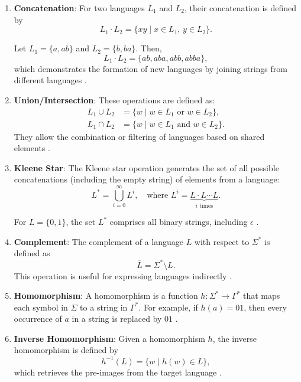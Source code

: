 \begin{enumerate}
    \item \textbf{Concatenation}: For two languages $L_1$ and $L_2$, their concatenation is defined by 
    \[
    L_1 \cdot L_2 = \{xy \mid x \in L_1,\, y \in L_2\}.
    \]
    \begin{example}
    Let $L_1 = \{a, ab\}$ and $L_2 = \{b, ba\}$. Then,
    \[
    L_1 \cdot L_2 = \{ab, aba, abb, abba\},
    \]
    which demonstrates the formation of new languages by joining strings from different languages \cite{hopcroft2006introduction}.
    \end{example}

    \item \textbf{Union/Intersection}: These operations are defined as:
    \begin{align*}
        L_1 \cup L_2 &= \{w \mid w \in L_1 \text{ or } w \in L_2\}, \\
        L_1 \cap L_2 &= \{w \mid w \in L_1 \text{ and } w \in L_2\}.
    \end{align*}
    They allow the combination or filtering of languages based on shared elements \cite{hopcroft2006introduction}.

    \item \textbf{Kleene Star}: The Kleene star operation generates the set of all possible concatenations (including the empty string) of elements from a language:
    \[
    L^\ast = \bigcup_{i=0}^\infty L^i, \quad \text{where } L^i = \underbrace{L \cdot L \cdots L}_{i \text{ times}}.
    \]
    \begin{example}
    For $L = \{0, 1\}$, the set $L^\ast$ comprises all binary strings, including $\epsilon$ \cite{hopcroft2006introduction}.
    \end{example}

    \item \textbf{Complement}: The complement of a language $L$ with respect to $\Sigma^\ast$ is defined as 
    \[
    \overline{L} = \Sigma^\ast \setminus L.
    \]
    This operation is useful for expressing languages indirectly \cite{hopcroft2006introduction}.

    \item \textbf{Homomorphism}: A homomorphism is a function $h: \Sigma^\ast \to \Gamma^\ast$ that maps each symbol in $\Sigma$ to a string in $\Gamma^\ast$. For example, if $h(a) = 01$, then every occurrence of $a$ in a string is replaced by $01$ \cite{hopcroft2006introduction}.

    \item \textbf{Inverse Homomorphism}: Given a homomorphism $h$, the inverse homomorphism is defined by 
    \[
    h^{-1}(L) = \{w \mid h(w) \in L\},
    \]
    which retrieves the pre-images from the target language \cite{hopcroft2006introduction}.
\end{enumerate}

